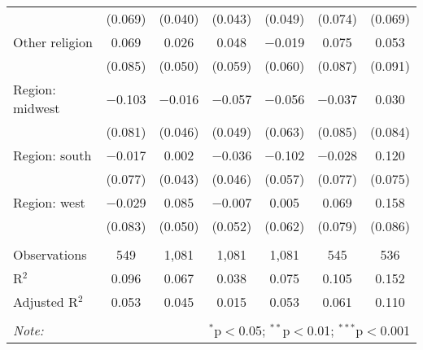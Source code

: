 \begin{tabular}{@{\extracolsep{5pt}}lcccccc}
  & (0.069) & (0.040) & (0.043) & (0.049) & (0.074) & (0.069) \\ 
  Other religion & 0.069 & 0.026 & 0.048 & $-$0.019 & 0.075 & 0.053 \\ 
  & (0.085) & (0.050) & (0.059) & (0.060) & (0.087) & (0.091) \\ 
  Region: midwest & $-$0.103 & $-$0.016 & $-$0.057 & $-$0.056 & $-$0.037 & 0.030 \\ 
  & (0.081) & (0.046) & (0.049) & (0.063) & (0.085) & (0.084) \\ 
  Region: south & $-$0.017 & 0.002 & $-$0.036 & $-$0.102 & $-$0.028 & 0.120 \\ 
  & (0.077) & (0.043) & (0.046) & (0.057) & (0.077) & (0.075) \\ 
  Region: west & $-$0.029 & 0.085 & $-$0.007 & 0.005 & 0.069 & 0.158 \\ 
  & (0.083) & (0.050) & (0.052) & (0.062) & (0.079) & (0.086) \\ 
 \hline \\[-1.8ex] 
Observations & 549 & 1,081 & 1,081 & 1,081 & 545 & 536 \\ 
R$^{2}$ & 0.096 & 0.067 & 0.038 & 0.075 & 0.105 & 0.152 \\ 
Adjusted R$^{2}$ & 0.053 & 0.045 & 0.015 & 0.053 & 0.061 & 0.110 \\ 
\hline 
\hline \\[-1.8ex] 
\textit{Note:}  & \multicolumn{6}{r}{$^{*}$p$<$0.05; $^{**}$p$<$0.01; $^{***}$p$<$0.001} \\ 
\end{tabular} 
